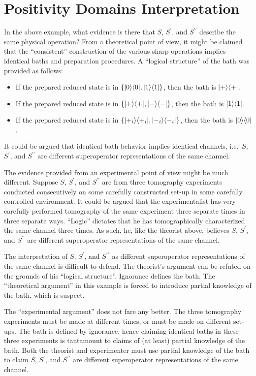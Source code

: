 \section{Positivity Domains Interpretation}
In the above example, what evidence is there that $S$, $S^\prime$, and $S^{\prime\prime}$ describe the same physical operation?  From a theoretical point of view, it might be claimed that the ``consistent'' construction of the various sharp operations implies identical baths and preparation procedures.  A ``logical structure'' of the bath was provided as follows:
\begin{itemize}
\item If the prepared reduced state is in $\{|0\rangle\langle0|,|1\rangle\langle1|\}$, then the bath is $|+\rangle\langle+|$.
\item If the prepared reduced state is in $\{|+\rangle\langle+|,|-\rangle\langle-|\}$, then the bath is $|1\rangle\langle1|$.
\item If the prepared reduced state is in $\{|+_i\rangle\langle+_i|,|-_i\rangle\langle-_i|\}$, then the bath is $|0\rangle\langle0|$.
\end{itemize}
It could be argued that identical bath behavior implies identical channels, i.e.\ $S$, $S^\prime$, and $S^{\prime\prime}$ are different superoperator representations of the same channel. 

The evidence provided from an experimental point of view might be much different.  Suppose $S$, $S^\prime$, and $S^{\prime\prime}$ are from three tomography experiments conducted consecutively on some carefully constructed set-up in some carefully controlled environment.  It could be argued that the experimentalist has very carefully performed tomography of the same experiment three separate times in three separate ways.  ``Logic'' dictates that he has tomographically characterized the same channel three times.  As such, he, like the theorist above, believes $S$, $S^\prime$, and $S^{\prime\prime}$ are different superoperator representations of the same channel.

The interpretation of $S$, $S^\prime$, and $S^{\prime\prime}$ as different superoperator representations of the same channel is difficult to defend.  The theorist's argument can be refuted on the grounds of his ``logical structure''.  Ignorance defines the bath.  The ``theoretical argument'' in this example is forced to introduce partial knowledge of the bath, which is suspect.

The ``experimental argument'' does not fare any better.  The three tomography experiments must be made at different times, or must be made on different set-ups.  The bath is defined by ignorance, hence claiming identical baths in these three experiments is tantamount to claims of (at least) partial knowledge of the bath.  Both the theorist and experimenter must use partial knowledge of the bath to claim $S$, $S^\prime$, and $S^{\prime\prime}$ are different superoperator representations of the same channel.

